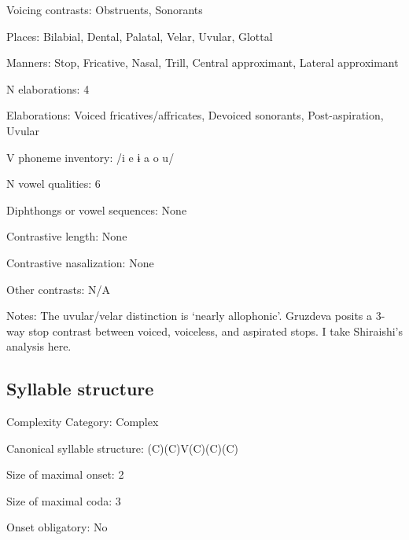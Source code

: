 {\begin{appendixdesc}
\item[Voicing contrasts:] Obstruents, Sonorants

\item[Places:] Bilabial, Dental, Palatal, Velar, Uvular, Glottal

\item[Manners:] Stop, Fricative, Nasal, Trill, Central approximant, Lateral approximant

\item[N elaborations:] 4

\item[Elaborations:] Voiced fricatives/affricates, Devoiced sonorants, Post-aspiration, Uvular

\item[V phoneme inventory:] /i e ɨ a o u/

\item[N vowel qualities:] 6

\item[Diphthongs or vowel sequences:] None

\item[Contrastive length:] None

\item[Contrastive nasalization:] None

\item[Other contrasts:] N/A

\item[Notes:] The uvular/velar distinction is ‘nearly allophonic’. Gruzdeva posits a 3-way stop contrast between voiced, voiceless, and aspirated stops. I take Shiraishi’s analysis here.
\end{appendixdesc}
\subsection*{Syllable structure}
\begin{appendixdesc}

\item[Complexity Category:] Complex

\item[Canonical syllable structure:] (C)(C)V(C)(C)(C) \citep[29--30]{Shiraishi2006}

\item[Size of maximal onset:] 2

\item[Size of maximal coda:] 3

\item[Onset obligatory:] No


\end{appendixdesc}}
